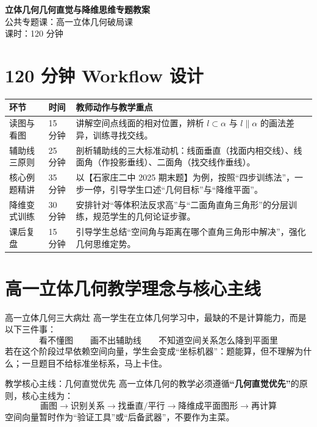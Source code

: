 \documentclass[11pt,a4paper]{ctexart}
\begin{document}
\begin{center}
  {\Large\bfseries 立体几何几何直觉与降维思维专题教案}\\[0.3em]
  {\large 公共专题课：高一立体几何破局课}\\[0.3em]
  {\small 课时：120 分钟}
\end{center}

\section{120 分钟 Workflow 设计}

\renewcommand{\arraystretch}{1.35}
\begin{tabularx}{\textwidth}{p{2.5cm}p{2.2cm}X}
\toprule
环节 & 时间 & 教师动作与教学重点 \\
\midrule
读图与看图 & 15 分钟 & 讲解空间点线面的相对位置，辨析 $l\subset \alpha$ 与 $l\parallel \alpha$ 的画法差异，训练寻找交线。\\
辅助线三原则 & 25 分钟 & 剖析辅助线的三大标准动机：线面垂直（找面内相交线）、线面角（作投影垂线）、二面角（找交线作垂线）。\\
核心例题精讲 & 35 分钟 & 以【石家庄二中 2025 期末题】为例，按照“四步训练法”，一步一停，引导学生口述“几何目标”与“降维平面”。\\
降维变式训练 & 30 分钟 & 安排针对“等体积法反求高”与“二面角直角三角形”的分层训练，规范学生的几何论证步骤。\\
课后复盘 & 15 分钟 & 引导学生总结“空间角与距离在哪个直角三角形中解决”，强化几何思维定势。\\
\bottomrule
\end{tabularx}


\section{高一立体几何教学理念与核心主线}

\begin{teachbox}{高一立体几何三大病灶}
高一学生在立体几何学习中，最缺的不是计算能力，而是以下三件事：
\[
  \boxed{
  \text{看不懂图}
  \quad\quad
  \text{画不出辅助线}
  \quad\quad
  \text{不知道空间关系怎么降到平面里}
  }
\]
若在这个阶段过早依赖空间向量，学生会变成“坐标机器”：题能算，但不理解为什么；一旦题目不给标准坐标系，马上卡住。
\end{teachbox}

\begin{teachbox}{教学核心主线：几何直觉优先}
高一立体几何的教学必须遵循\textbf{“几何直觉优先”}的原则，核心主线为：
\[
  \boxed{
  \text{画图}
  \rightarrow
  \text{识别关系}
  \rightarrow
  \text{找垂直/平行}
  \rightarrow
  \text{降维成平面图形}
  \rightarrow
  \text{再计算}
  }
\]
空间向量暂时作为“验证工具”或“后备武器”，不要作为主菜。
\end{teachbox}
\end{document}
